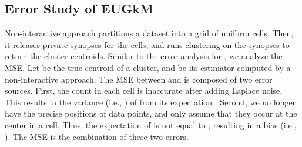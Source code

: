 \begin{comment}


\dpl runs  iterations.  Within each round, the privacy budget needs to be divided among the count and the  sum queries.  Suppose  is allocated to the count query, and  is allocated to the sum query for the -th dimension, for each .
While all dimensions should be treated equally, i.e., , an interesting question is what should be the right ratio of .  This question has not answered before.
The \dpl approach allocates the privacy budget according to the sensitivities of different queries; thus , assuming that each dimension is normalized to .  Thus, different  values will result in different allocations of privacy budget.


This, however, is not optimal.  Plugging  and  into Equation~\ref{eqn:DPLMSEoi}, one obtains

Minimization of the above \text{Subject to }  can be solved using
the method of {\em Lagrange multipliers}.  The optimal proportion is



The optimal proportion improves the MSE of \dpl. Plugging it back in Equation \ref{eqn:DPLMSEsumOi}, it follows that

which is consistently lower than the MSE in Equation \ref{eqn:DPLMSE_approx} developed for the original \dpl.

We use \dplscopt to represent the \dpl method that has the above improved privacy budget allocation between sum and count functions. \todo{Experiments to show the improvements...}
\end{comment}

\subsection{Error Study of EUGkM}\label{sec:non_inter_analysis}

Non-interactive approach partitions a dataset into a grid of  uniform cells. Then, it releases private synopses for the cells, and runs \km clustering on the synopses to return the cluster centroids. 
Similar to the error analysis for \dpl, we analyze the MSE. Let  be the true centroid of a cluster, and  be its estimator computed by a non-interactive approach. The MSE between  and  is composed of two error sources. First, the count in each cell is inaccurate after adding Laplace noise. This results in the variance (i.e., ) of  from its expectation . Second, we no longer have the precise positions of data points, and only assume that they occur at the center in a cell. Thus, the expectation of  is not equal to , resulting in a bias (i.e., ). The MSE is the combination of these two errors.




